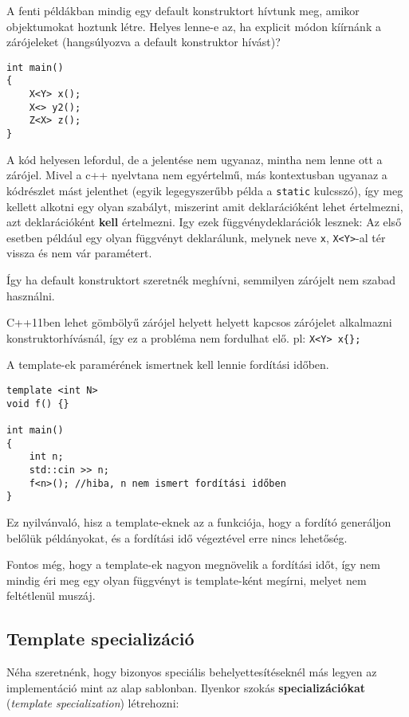 \documentclass[a4paper,11.5pt,table]{article}
\begin{document}
	A fenti példákban mindig egy default konstruktort hívtunk meg, amikor objektumokat hoztunk létre. Helyes lenne-e az, ha explicit módon kíírnánk a zárójeleket (hangsúlyozva a default konstruktor hívást)?
\begin{lstlisting}
int main()
{
	X<Y> x();
	X<> y2();
	Z<X> z();
}
\end{lstlisting}
	A kód helyesen lefordul, de a jelentése nem ugyanaz, mintha nem lenne ott a zárójel. Mivel a c++ nyelvtana nem egyértelmű, más kontextusban ugyanaz a kódrészlet mást jelenthet (egyik legegyszerűbb példa a \texttt{static} kulcsszó), így meg kellett alkotni egy olyan szabályt, miszerint amit deklarációként lehet értelmezni, azt deklarációként \textbf{kell} értelmezni. Igy ezek függvénydeklarációk lesznek: Az első esetben például egy olyan függvényt deklarálunk, melynek neve \texttt{x}, \texttt{X<Y>}-al tér vissza és nem vár paramétert. 
	
	Így ha default konstruktort szeretnék meghívni, semmilyen zárójelt nem szabad használni.
	\begin{note}
		C++11ben lehet gömbölyű zárójel helyett helyett kapcsos zárójelet alkalmazni konstruktorhívásnál, így ez a probléma nem fordulhat elő. pl: \texttt{X<Y> x\{\};}
	\end{note}
	
	A template-ek paramérének ismertnek kell lennie fordítási időben.
	\begin{lstlisting}
template <int N>
void f() {}

int main()
{
	int n;
	std::cin >> n;
	f<n>(); //hiba, n nem ismert fordítási időben
}
	\end{lstlisting}
	Ez nyilvánvaló, hisz a template-eknek az a funkciója, hogy a fordító generáljon belőlük példányokat, és a fordítási idő végeztével erre nincs lehetőség.
	\begin{note}
		Fontos még, hogy a template-ek nagyon megnövelik a fordítási időt, így nem mindig éri meg egy olyan függvényt is template-ként megírni, melyet nem feltétlenül muszáj.
	\end{note}
	\subsection{Template specializáció}
	Néha szeretnénk, hogy bizonyos speciális behelyettesítéseknél más legyen az implementáció mint az alap sablonban. Ilyenkor szokás \textbf{specializációkat} (\textit{template specialization}) létrehozni:
	
\end{document}
